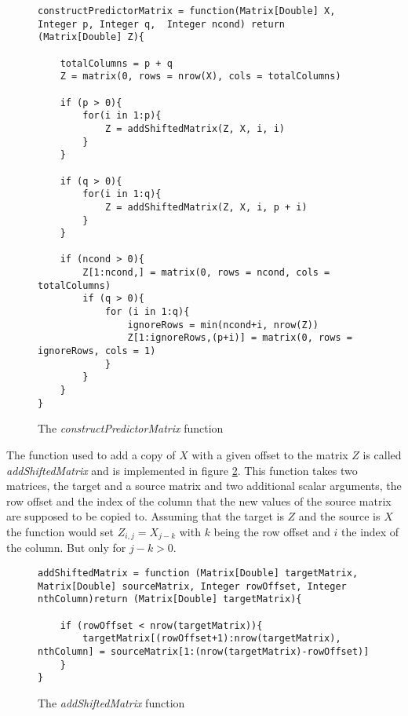 \begin{figure}[!ht]
\centering
\begin{verbatim}
constructPredictorMatrix = function(Matrix[Double] X, Integer p, Integer q,  Integer ncond) return (Matrix[Double] Z){
    
    totalColumns = p + q
	Z = matrix(0, rows = nrow(X), cols = totalColumns)

    if (p > 0){
        for(i in 1:p){
            Z = addShiftedMatrix(Z, X, i, i)
        }
    }

    if (q > 0){
        for(i in 1:q){
            Z = addShiftedMatrix(Z, X, i, p + i)
        }
    }
    
    if (ncond > 0){
        Z[1:ncond,] = matrix(0, rows = ncond, cols = totalColumns)
        if (q > 0){
            for (i in 1:q){
                ignoreRows = min(ncond+i, nrow(Z))
                Z[1:ignoreRows,(p+i)] = matrix(0, rows = ignoreRows, cols = 1)
            }
        }
    }
}
\end{verbatim}
\vspace*{-0.3cm}
\caption{The \textit{constructPredictorMatrix} function}
\label{fig:constructPredictorMatrix}
\end{figure}

The function used to add a copy of $X$ with a given offset to the matrix $Z$ is called \textit{addShiftedMatrix} and is implemented in figure \ref{fig:addShiftedMatrix}. This function takes two matrices, the target and a source matrix and two additional scalar arguments, the row offset and the index of the column that the new values of the source matrix are supposed to be copied to. Assuming that the target is $Z$ and the source is $X$ the function would set $Z_{i,j} = X_{j-k}$ with $k$ being the row offset and $i$ the index of the column. But only for $j-k > 0$.

\begin{figure}[!ht]
\centering
\begin{verbatim}
addShiftedMatrix = function (Matrix[Double] targetMatrix,  Matrix[Double] sourceMatrix, Integer rowOffset, Integer nthColumn)return (Matrix[Double] targetMatrix){

    if (rowOffset < nrow(targetMatrix)){
        targetMatrix[(rowOffset+1):nrow(targetMatrix), nthColumn] = sourceMatrix[1:(nrow(targetMatrix)-rowOffset)]
    }
}
\end{verbatim}
\vspace*{-0.3cm}
\caption{The \textit{addShiftedMatrix} function}
\label{fig:addShiftedMatrix}
\end{figure}

